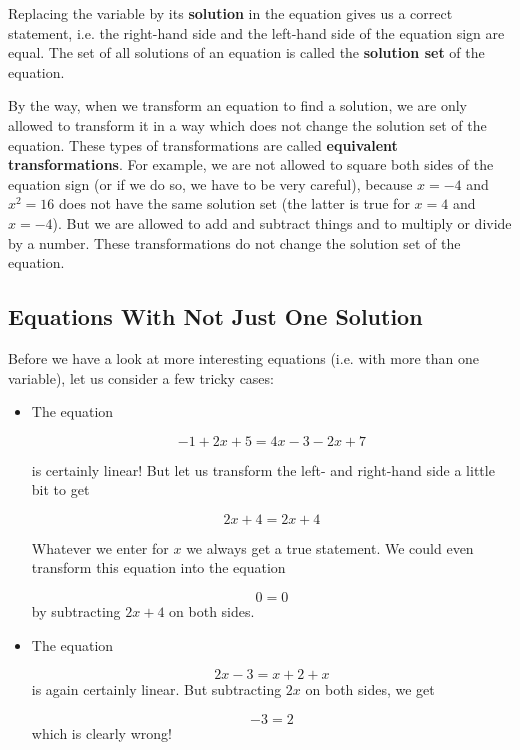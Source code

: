 \begin{tcolorbox}[colback=white]
Replacing the variable by its \textbf{solution} in the equation gives us a correct statement, i.e. the right-hand side and the left-hand side of the equation sign are equal. The set of all solutions of an equation is called the \textbf{solution set} of the equation.
\end{tcolorbox}
\vsp

\begin{remark}
By the way, when we transform an equation to find a solution, we are only allowed to transform it in a way which does not change the solution set of the equation. These types of transformations are called \textbf{equivalent transformations}. For example, we are not allowed to square both sides of the equation sign (or if we do so, we have to be very careful), because $x=-4$ and $x^2=16$ does not have the same solution set (the latter is true for $x=4$ and $x=-4$). But we are allowed to add and subtract things and to multiply or divide by a number. These transformations do not change the solution set of the equation.
\end{remark}

\newpage
\subsection{Equations With Not Just One Solution}

Before we have a look at more interesting equations (i.e. with more than one variable), let us consider a few tricky cases:
\vsp
\begin{itemize}
\item The equation 

\[
-1+2x+5=4x-3-2x+7
\]

is certainly linear! But let us transform the left- and right-hand side a little bit to get

\[
2x+4=2x+4
\]

Whatever we enter for $x$ we always get a true statement. We could even transform this equation into the equation

\[
0=0
\]
by subtracting $2x+4$ on both sides. 

\item The equation

\[
2x-3=x+2+x
\]
is again certainly linear. But subtracting $2x$ on both sides, we get

\[
-3=2
\]
which is clearly wrong! 

\end{itemize}

